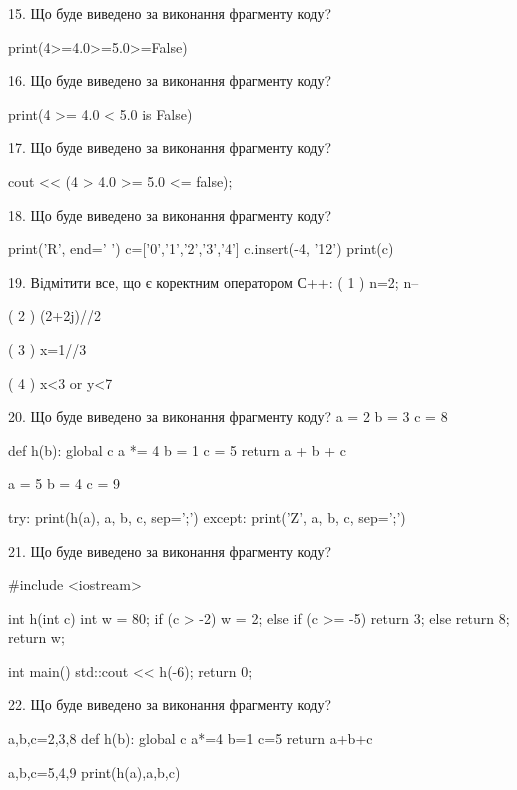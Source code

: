 \documentclass[11pt]{article}
\begin{document}

15. Що буде виведено за виконання фрагменту коду?

print(4>=4.0>=5.0>=False)


16. Що буде виведено за виконання фрагменту коду?

print(4 >= 4.0 < 5.0 is False)


17. Що буде виведено за виконання фрагменту коду?

cout << (4 > 4.0 >= 5.0 <= false);


18. Що буде виведено за виконання фрагменту коду?

print('R', end=' ')
c=['0','1','2','3','4']
c.insert(-4, '12')
print(c)



19. %
Відмітити все, що є коректним оператором С++:
( 1 ) n=2; n--

( 2 ) (2+2j)//2

( 3 ) x=1//3

( 4 ) x<3 or y<7


20. Що буде виведено за виконання фрагменту коду?
a = 2
b = 3
c = 8

def h(b):
global c    a *= 4
    b = 1
    c = 5
    return a + b + c

a = 5
b = 4
c = 9

try:
    print(h(a), a, b, c, sep=';')
except:
    print('Z', a, b, c, sep=';')


21. Що буде виведено за виконання фрагменту коду?

#include <iostream>

int h(int c){
    int w = 80;
    if (c > -2) 
        w = 2;
    else if (c >= -5)
         return 3;
    else
         return 8;
    return w;
}

int main(){
    std::cout << h(-6);
    return 0;
}



22. Що буде виведено за виконання фрагменту коду?

a,b,c=2,3,8
def h(b):
global c    a*=4
    b=1
    c=5
    return a+b+c

a,b,c=5,4,9
print(h(a),a,b,c)
\end{document}
